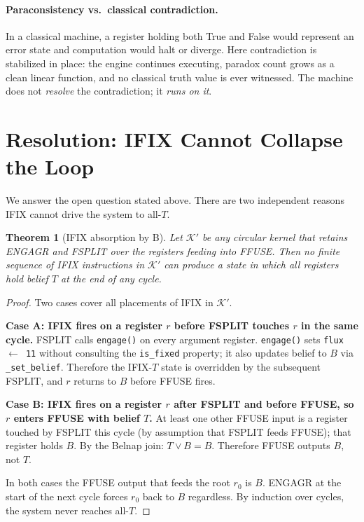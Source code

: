 \documentclass[12pt,a4paper]{article}
\newtheorem{theorem}{Theorem}
\theoremstyle{definition}
\theoremstyle{remark}
\begin{document}
\paragraph{Paraconsistency vs.\ classical contradiction.}
In a classical machine, a register holding both True and False would represent
an error state and computation would halt or diverge.  Here contradiction is
stabilized in place: the engine continues executing, paradox count grows as a
clean linear function, and no classical truth value is ever witnessed.  The
machine does not \emph{resolve} the contradiction; it \emph{runs on it}.

\section{Resolution: IFIX Cannot Collapse the Loop}

We answer the open question stated above.  There are two independent reasons
IFIX cannot drive the system to all-$T$.

\begin{theorem}[IFIX absorption by B]
\label{thm:ifix}
Let $\mathcal{K}'$ be any circular kernel that retains ENGAGR and FSPLIT
over the registers feeding into FFUSE.  Then no finite sequence of IFIX
instructions in $\mathcal{K}'$ can produce a state in which all registers
hold belief $T$ at the end of any cycle.
\end{theorem}

\begin{proof}
Two cases cover all placements of IFIX in $\mathcal{K}'$.

\textbf{Case A: IFIX fires on a register $r$ before FSPLIT touches $r$ in
the same cycle.}
FSPLIT calls \texttt{engage()} on every argument register.
\texttt{engage()} sets \texttt{flux $\leftarrow$ 11} without consulting the
\texttt{is\_fixed} property; it also updates belief to $B$ via
\texttt{\_set\_belief}.  Therefore the IFIX-$T$ state is overridden by the
subsequent FSPLIT, and $r$ returns to $B$ before FFUSE fires.

\textbf{Case B: IFIX fires on a register $r$ after FSPLIT and before
FFUSE, so $r$ enters FFUSE with belief $T$.}
At least one other FFUSE input is a register touched by FSPLIT this cycle
(by assumption that FSPLIT feeds FFUSE); that register holds $B$.
By the Belnap join: $T \vee B = B$.
Therefore FFUSE outputs $B$, not $T$.

In both cases the FFUSE output that feeds the root $r_0$ is $B$.
ENGAGR at the start of the next cycle forces $r_0$ back to $B$ regardless.
By induction over cycles, the system never reaches all-$T$.
\end{proof}
\end{document}
